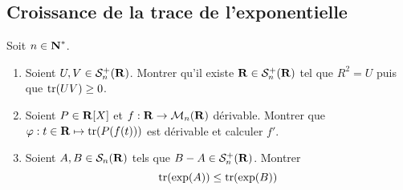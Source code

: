 \subsection{Croissance de la trace de l'exponentielle}
\begin{exercice}
	Soit $n\in\N^*$.
	\begin{enumerate}
		\item Soient $U,V\in\mathcal S_n^+(\R)$. Montrer qu'il existe $\R\in\mathcal S_n^+(\R)$ tel que $R^2 = U$ puis que $\tr(UV)\geq 0$.
		\item Soient $P\in\R[X]$ et $f:\R\to\mathcal M_n(\R)$ dérivable. Montrer que $\varphi:t\in\R\mapsto\tr(P(f(t)))$ est dérivable et calculer $f'$.
		\item Soient $A,B\in\mathcal S_n(\R)$ tels que $B-A\in\mathcal S_n^+(\R)$. Montrer 
		\[
			\tr(\exp(A))\leq\tr(\exp(B))
		\]
	\end{enumerate}
\end{exercice}


